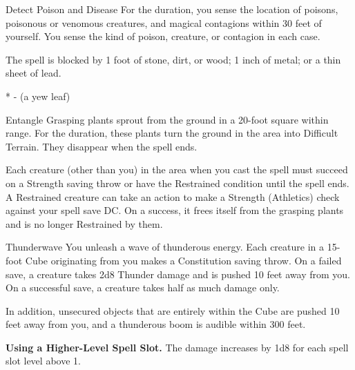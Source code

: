 \begin{Spell}[
    tags={Concentration, Ritual},
    level=1st,
    time=1 Action,
    range=Self (30 ft.),
    components={V, S, M*},
    duration=10 Minutes,
    school=Divination,
    attack=None,
    effect=Detection
  ]{Detect Poison and Disease}
For the duration, you sense the location of poisons, poisonous or venomous creatures, and magical contagions within 30 feet of yourself. You sense the kind of poison, creature, or contagion in each case.

The spell is blocked by 1 foot of stone, dirt, or wood; 1 inch of metal; or a thin sheet of lead.

* - (a yew leaf)
\end{Spell}


\begin{Spell}[
    tags=Concentration,
    level=1st,
    time=1 Action,
    range=90 ft. (20 ft.),
    components={V, S},
    duration=1 Minute,
    school=Conjuration,
    attack=STR Save,
    effect=Restrained
  ]{Entangle}
Grasping plants sprout from the ground in a 20-foot square within range. For the duration, these plants turn the ground in the area into Difficult Terrain. They disappear when the spell ends.

Each creature (other than you) in the area when you cast the spell must succeed on a Strength saving throw or have the Restrained condition until the spell ends. A Restrained creature can take an action to make a Strength (Athletics) check against your spell save DC. On a success, it frees itself from the grasping plants and is no longer Restrained by them.
\end{Spell}


\begin{Spell}[
    level=1st,
    time=1 Action,
    range=Self (15 ft.),
    components={V, S},
    duration=Instantaneous,
    school=Evocation,
    attack=CON Save,
    effect=Thunder
  ]{Thunderwave}
You unleash a wave of thunderous energy. Each creature in a 15-foot Cube originating from you makes a Constitution saving throw. On a failed save, a creature takes 2d8 Thunder damage and is pushed 10 feet away from you. On a successful save, a creature takes half as much damage only.

In addition, unsecured objects that are entirely within the Cube are pushed 10 feet away from you, and a thunderous boom is audible within 300 feet.

\textbf{Using a Higher-Level Spell Slot.} The damage increases by 1d8 for each spell slot level above 1.
\end{Spell}


